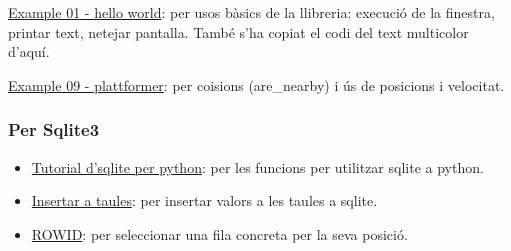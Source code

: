 \begin{itemize}
\begin{item}
\href{https://raw.githubusercontent.com/kitao/pyxel/main/python/pyxel/examples/01_hello_pyxel.py}
{Example 01 - hello world}:
per usos b\`asics de la llibreria:
execuci\'o de la finestra, printar text, netejar pantalla.
Tamb\'e s'ha copiat el codi del text multicolor d'aqu\'i.
\end{item}

\begin{item}
\href{https://raw.githubusercontent.com/kitao/pyxel/main/python/pyxel/examples/10_platformer.py}
{Example 09 - plattformer}:
per co\lgem isions (are\_nearby) i \'us de posicions i velocitat.
\end{item}
\end{itemize}

\subsubsection*{Per Sqlite3}
\begin{itemize}
\item{\href{https://pynative.com/python-sqlite/}
{Tutorial d'sqlite per python}}:
per les funcions per utilitzar sqlite a python.

\item{\href{https://www.sqlite.org/lang_insert.html}
{Insertar a taules}}:
per insertar valors a les taules a sqlite.

\item{\href{https://sqlite.org/rowidtable.html}
{ROWID}}:
per seleccionar una fila concreta per la seva posici\'o.
\end{itemize}



